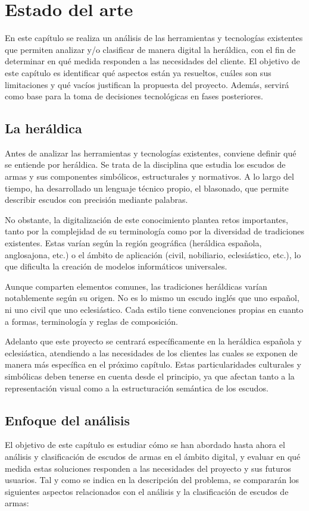 \chapter{Estado del arte}

En este capítulo se realiza un análisis de las herramientas y tecnologías
existentes que permiten analizar y/o clasificar de manera digital la heráldica, con el fin
de determinar en qué medida responden a las necesidades del cliente.
El objetivo de este capítulo es identificar qué aspectos están ya resueltos,
cuáles son sus limitaciones y qué vacíos justifican la propuesta del proyecto.
Además, servirá como base para la toma de decisiones tecnológicas en fases posteriores.

\section{La heráldica}

Antes de analizar las herramientas y tecnologías existentes, conviene definir qué se entiende 
por heráldica. Se trata de la disciplina que estudia los escudos de armas y sus componentes 
simbólicos, estructurales y normativos.  
A lo largo del tiempo, ha desarrollado un lenguaje técnico propio, el blasonado, que permite 
describir escudos con precisión mediante palabras.  

No obstante, la digitalización de este conocimiento plantea retos importantes, tanto por la 
complejidad de su terminología como por la diversidad de tradiciones existentes. Estas varían 
según la región geográfica (heráldica española, anglosajona, etc.) o el ámbito de aplicación 
(civil, nobiliario, eclesiástico, etc.), lo que dificulta la creación de modelos informáticos 
universales.

Aunque comparten elementos comunes, las tradiciones heráldicas varían notablemente 
según su origen. No es lo mismo un escudo inglés que uno español, ni uno civil que 
uno eclesiástico. Cada estilo tiene convenciones propias en cuanto a formas, 
terminología y reglas de composición.

Adelanto que este proyecto se centrará específicamente en la heráldica española y eclesiástica, 
atendiendo a las necesidades de los clientes las cuales se exponen de manera más específica en 
el próximo capítulo. Estas particularidades culturales y simbólicas deben tenerse en cuenta 
desde el principio, ya que afectan tanto a la representación visual como a la estructuración 
semántica de los escudos.

\section{Enfoque del análisis}
El objetivo de este capítulo es estudiar cómo se han abordado hasta ahora el análisis y
clasificación de escudos de armas en el ámbito digital, y evaluar en qué medida estas soluciones 
responden a las necesidades del proyecto y sus futuros usuarios.
Tal y como se indica en la descripción del problema, se compararán los siguientes aspectos 
relacionados con el análisis y la clasificación de escudos de armas:

